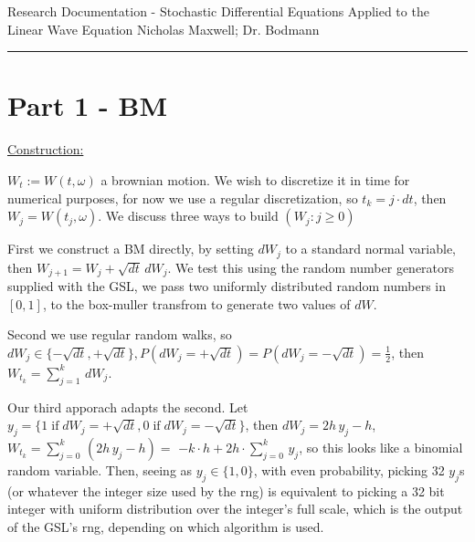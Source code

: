 \documentclass[12pt]{article}
\newcommand{\IF}[0] { \; \textrm{if} \; }
\begin{document}
\begin{flushleft}
Research Documentation - Stochastic Differential Equations Applied to the Linear Wave Equation
Nicholas Maxwell; Dr. Bodmann\\
\end{flushleft}

\begin{flushleft}
\addvspace{5pt} \hrule
\end{flushleft}	



\section*{Part 1 - BM}

\begin{flushleft}
\underline{Construction:}
\end{flushleft}


\begin{flushleft}
$W_t := W(t,\omega)$ a brownian motion. We wish to discretize it in time for numerical purposes, for now we use a regular discretization, so $t_k = j \cdot dt$, then $W_j = W(t_j, \omega)$. We discuss three ways to build $( W_j: j \ge 0 )$
\end{flushleft}

\begin{flushleft}
First we construct a BM directly, by setting $dW_j$ to a standard normal variable, then $W_{j+1} = W_j + \sqrt{dt} \, dW_j$. We test this using the random number generators supplied with the GSL, we pass two uniformly distributed random numbers in $[0,1]$, to the box-muller transfrom to generate two values of $dW$.
\end{flushleft}

\begin{flushleft}
Second we use regular random walks, so $dW_j \in \{-\sqrt{dt} , +\sqrt{dt} \}, P(dW_j = +\sqrt{dt}) = P(dW_j = -\sqrt{dt}) = \frac{1}{2}$, then $W_{t_k} = \sum_{j=1}^{k} \, dW_j$.
\end{flushleft}

\begin{flushleft}
Our third apporach adapts the second. Let $y_j = \{ 1 \IF dW_j = +\sqrt{dt}, 0 \IF dW_j = -\sqrt{dt} \}$, then $dW_j = 2h\, y_j-h$, $W_{t_k} = \sum_{j=0}^{k} \, (2h\, y_j-h) =$ $ -k \cdot h + 2h \cdot \sum_{j=0}^{k} \, y_j$, so this looks like a binomial random variable. Then, seeing as $y_j \in \{ 1,0\}$, with even probability, picking 32 $y_j$s (or whatever the integer size used by the rng) is equivalent to picking a 32 bit integer with uniform distribution over the integer's full scale, which is the output of the GSL's rng, depending on which algorithm is used.
\end{flushleft}
\end{document}
